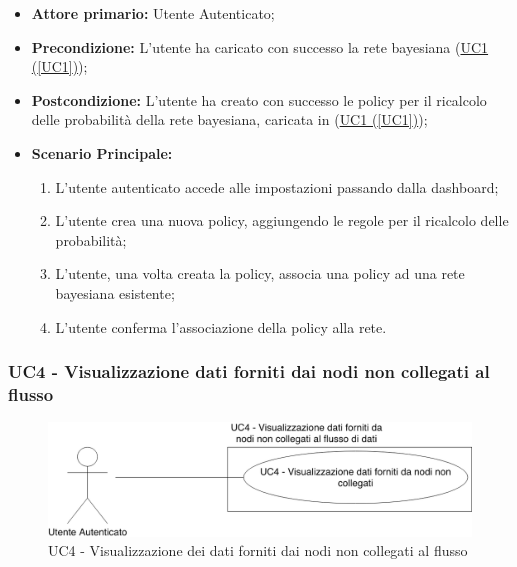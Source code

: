 \begin{itemize}
	\item \textbf{Attore primario:} Utente Autenticato; 
	\item \textbf{Precondizione:} L'utente ha caricato con successo la rete bayesiana (\hyperref[UC1]{UC1 (\ref*{UC1})});

	\item \textbf{Postcondizione:} L'utente ha creato con successo le policy per il ricalcolo delle probabilità della rete bayesiana, caricata in (\hyperref[UC1]{UC1 (\ref*{UC1})});	
	\item \textbf{Scenario Principale:}

	\begin{enumerate}
		\item L'utente autenticato accede alle impostazioni passando dalla dashboard;
		\item L'utente crea una nuova policy, aggiungendo le regole per il ricalcolo delle probabilità;
		\item L'utente, una volta creata la policy, associa una policy ad una rete bayesiana esistente;
		\item L'utente conferma l'associazione della policy alla rete.
	\end{enumerate}
	
\end{itemize}



\subsubsection{UC4 - Visualizzazione dati forniti dai nodi non collegati al flusso}\label{UC4}

\begin{figure}[H]
\centering
\includegraphics[scale=0.4]{./images/UC4.png}
\caption{UC4 - Visualizzazione dei dati forniti dai nodi non collegati al flusso}
\end{figure}

